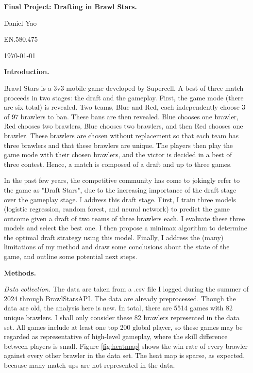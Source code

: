 \documentclass[11pt]{article}
\begin{document}
\textbf{Final Project: Drafting in Brawl Stars.}

Daniel Yao

EN.580.475

\today

\textbf{Introduction.}

Brawl Stars is a 3v3 mobile game developed by Supercell. A best-of-three match proceeds in two stages: the draft and the gameplay. First, the game mode (there are six total) is revealed. Two teams, Blue and Red, each independently choose 3 of 97 brawlers to ban. These bans are then revealed. Blue chooses one brawler, Red chooses two brawlers, Blue chooses two brawlers, and then Red chooses one brawler. These brawlers are chosen without replacement so that each team has three brawlers and that these brawlers are unique. The players then play the game mode with their chosen brawlers, and the victor is decided in a best of three contest. Hence, a match is composed of a draft and up to three games.

In the past few years, the competitive community has come to jokingly refer to the game as "Draft Stars", due to the increasing importance of the draft stage over the gameplay stage. I address this draft stage. First, I train three models (logistic regression, random forest, and neural network) to predict the game outcome given a draft of two teams of three brawlers each. I evaluate these three models and select the best one. I then propose a minimax algorithm to determine the optimal draft strategy using this model. Finally, I address the (many) limitations of my method and draw some conclusions about the state of the game, and outline some potential next steps.

\textbf{Methods.}

\textit{Data collection.} The data are taken from a .csv file I logged during the summer of 2024 through BrawlStarsAPI. The data are already preprocessed. Though the data are old, the analysis here is new. In total, there are 5514 games with 82 unique brawlers. I shall only consider these 82 brawlers represented in the data set. All games include at least one top 200 global player, so these games may be regarded as representative of high-level gameplay, where the skill difference between players is small. Figure \ref{fig:heatmap} shows the win rate of every brawler against every other brawler in the data set. The heat map is sparse, as expected, because many match ups are not represented in the data.
\end{document}
